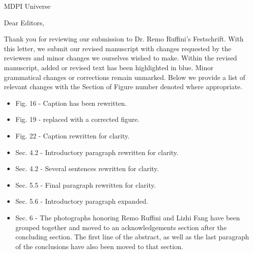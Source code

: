 \documentclass[a4paper, 10pt]{letter}
\begin{document}
\begin{letter}{MDPI Universe}

\opening{Dear Editors,}

Thank you for reviewing our submission to Dr. Remo Ruffini's Festschrift. With this letter, we submit our revised manuscript with changes requested by the reviewers and minor changes we ourselves wished to make. Within the revised manuscript, added or revised text has been highlighted in blue. Minor grammatical changes or corrections remain unmarked. Below we provide a list of relevant changes with the Section of Figure number denoted where appropriate.

\begin{itemize}
    \item Fig. 16 - Caption has been rewritten.
    \item Fig. 19 - replaced with a corrected figure.
    \item Fig. 22 - Caption rewritten for clarity.
    \item Sec. 4.2 - Introductory paragraph rewritten for clarity.
    \item Sec. 4.2 - Several sentences rewritten for clarity.
    \item Sec. 5.5 - Final paragraph rewritten for clarity.
    \item Sec. 5.6 - Introductory paragraph expanded.
    \item Sec. 6 - The photographs honoring Remo Ruffini and Lizhi Fang have been grouped together and moved to an acknowledgements section after the concluding section. The first line of the abstract, as well as the last paragraph of the conclusions have also been moved to that section.
\end{itemize}


\end{letter}
\end{document}
